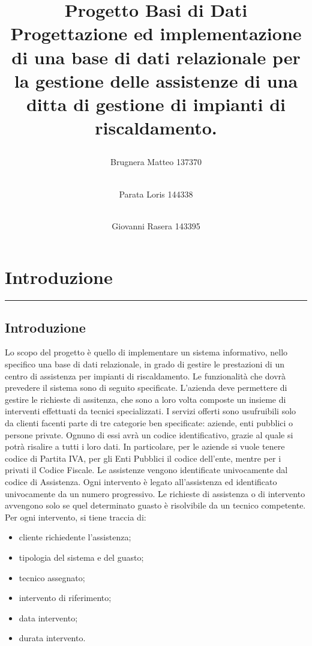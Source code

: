 \documentclass[legalpaper]{article}
\begin{document}
\title{%
\raggedright \textbf{Progetto Basi di Dati} \\ \large \bigskip Progettazione ed implementazione di una base di dati relazionale per la gestione delle assistenze di una ditta di gestione di impianti di riscaldamento.}
\maketitle

\begin{flushleft}
\author{Brugnera Matteo 137370 \and \\ Parata Loris 144338 \and \\ Giovanni Rasera 143395}

\end{flushleft}


\newpage
\tableofcontents

\newpage
\section{Introduzione}
\rule{\linewidth}{1.5pt}
\subsection{Introduzione}
Lo scopo del progetto è quello di implementare un sistema informativo, nello specifico una base di dati relazionale, in grado di gestire le prestazioni di un centro di assistenza per impianti di riscaldamento. 
Le funzionalità che dovrà prevedere il sistema sono di seguito specificate.
L'azienda deve permettere di gestire le richieste di assitenza, che sono a loro volta composte un insieme di interventi effettuati da tecnici specializzati.
I servizi offerti sono usufruibili solo da clienti facenti parte di tre categorie ben specificate: aziende, enti pubblici o persone private.
Ognuno di essi avrà un codice identificativo, grazie al quale si potrà risalire a tutti i loro dati. 
In particolare, per le aziende si vuole tenere codice di Partita IVA, per gli Enti Pubblici il codice dell'ente, mentre per i privati il Codice Fiscale.
Le assistenze vengono identificate univocamente dal codice di Assistenza. Ogni intervento è legato all'assistenza ed identificato univocamente da un numero progressivo. 
Le richieste di assistenza o di intervento avvengono solo se quel determinato guasto è risolvibile da un tecnico competente.\\
Per ogni intervento, si tiene traccia di:
\medskip
\begin{itemize}
    \item cliente richiedente l'assistenza;
    \item tipologia del sistema e del guasto;
    \item tecnico assegnato;
    \item intervento di riferimento;
    \item data intervento;
    \item durata intervento.
\end{itemize}
\end{document}
